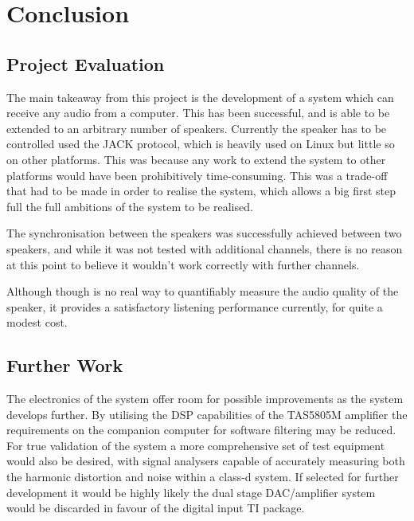 \documentclass[main.tex]{subfiles}
\begin{document}
\chapter{Conclusion}
\section{Project Evaluation}
The main takeaway from this project is the development of a system which can receive any audio from a computer.
This has been successful, and is able to be extended to an arbitrary number of speakers.
Currently the speaker has to be controlled used the JACK protocol, which is heavily used on Linux but little so on other platforms.
This was because any work to extend the system to other platforms would have been prohibitively time-consuming.
This was a trade-off that had to be made in order to realise the system, which allows a big first step full the full ambitions of the system to be realised.

The synchronisation between the speakers was successfully achieved between two speakers, and while it was not tested with additional channels, there is no reason at this point to believe it wouldn't work correctly with further channels.

Although though is no real way to quantifiably measure the audio quality of the speaker, it provides a satisfactory listening performance currently, for quite a modest cost.

\section{Further Work}
The electronics of the system offer room for possible improvements as the system develops further. By utilising the DSP capabilities of the TAS5805M amplifier the requirements on the companion computer for software filtering may be reduced. For true validation of the system a more comprehensive set of test equipment would also be desired, with signal analysers capable of accurately measuring both the harmonic distortion and noise within a class-d system. If selected for further development it would be highly likely the dual stage DAC/amplifier system would be discarded in favour of the digital input TI package.
\end{document}
